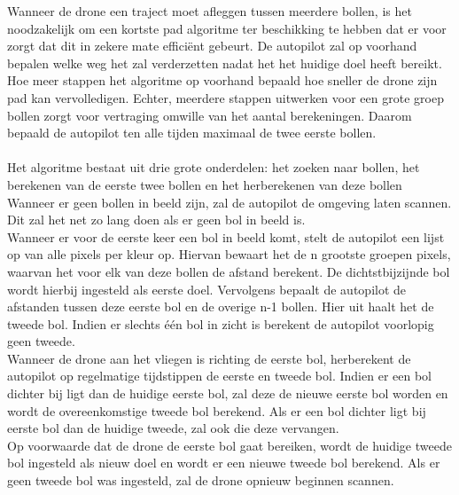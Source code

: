 \noindent
Wanneer de drone een traject moet afleggen tussen meerdere bollen, is het noodzakelijk om een kortste pad algoritme ter beschikking te hebben dat er voor zorgt dat dit in zekere mate effici\"ent gebeurt. De autopilot zal op voorhand bepalen welke weg het zal verderzetten nadat het het huidige doel heeft bereikt. Hoe meer stappen het algoritme op voorhand bepaald hoe sneller de drone zijn pad kan vervolledigen. Echter, meerdere stappen uitwerken voor een grote groep bollen zorgt voor vertraging omwille van het aantal berekeningen. Daarom bepaald de autopilot ten alle tijden maximaal de twee eerste bollen.
\\
\\
Het algoritme bestaat uit drie grote onderdelen: het zoeken naar bollen, het berekenen van de eerste twee bollen en het herberekenen van deze bollen
\\
Wanneer er geen bollen in beeld zijn, zal de autopilot de omgeving laten scannen. Dit zal het net zo lang doen als er geen bol in beeld is.
\\
Wanneer er voor de eerste keer een bol in beeld komt, stelt de autopilot een lijst op van alle pixels per kleur op. Hiervan bewaart het de n grootste groepen pixels, waarvan het voor elk van deze bollen de afstand berekent. De dichtstbijzijnde bol wordt hierbij ingesteld als eerste doel. Vervolgens bepaalt de autopilot de afstanden tussen deze eerste bol en de overige n-1 bollen. Hier uit haalt het de tweede bol. Indien er slechts \'e\'en bol in zicht is berekent de autopilot voorlopig geen tweede.
\\
Wanneer de drone aan het vliegen is richting de eerste bol, herberekent de autopilot op regelmatige tijdstippen de eerste en tweede bol. Indien er een bol dichter bij ligt dan de huidige eerste bol, zal deze de nieuwe eerste bol worden en wordt de overeenkomstige tweede bol berekend. Als er een bol dichter ligt bij eerste bol dan de huidige tweede, zal ook die deze vervangen.
\\
Op voorwaarde dat de drone de eerste bol gaat bereiken, wordt de huidige tweede bol ingesteld als nieuw doel en wordt er een nieuwe tweede bol berekend. Als er geen tweede bol was ingesteld, zal de drone opnieuw beginnen scannen.